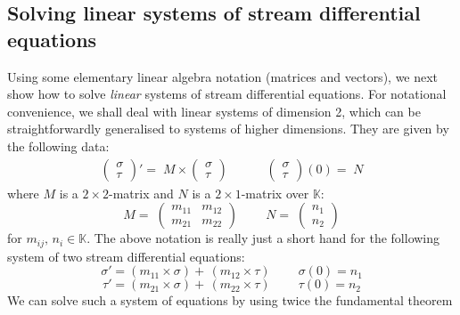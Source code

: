 \documentclass[3p]{elsarticle}
\newcommand{\matrixproduct}{\times} %
\newcommand{\streamproduct}{\times} %
\newcommand{\K}{\mathbb{K}}            %
\begin{document}
\subsection{Solving linear systems of stream differential equations}
\label{Solving linear systems of stream differential equations}
Using some elementary linear algebra notation (matrices and vectors),
we next show how to solve \emph{linear} systems of stream differential equations.
For notational convenience, we shall deal with linear systems of dimension 2,
which can be straightforwardly generalised to systems of higher dimensions.
They are given by the following data:
\begin{eqnarray}\label{linear_system_of_dimension_2}
\begin{pmatrix}%
\sigma \\ \tau
\end{pmatrix} '
= \; M \matrixproduct
\begin{pmatrix}%
\sigma \\ \tau
\end{pmatrix}
\;\;\;\;\;\;\;\;\;\;\;
\begin{pmatrix}%
\sigma \\ \tau
\end{pmatrix} (0)
= \;
N
\end{eqnarray}
where $M$ is a $2 \times 2$-matrix and $N$ is a $2 \times 1$-matrix
over $\K$:
\[
M = \;
\begin{pmatrix}%
m_{11} & m_{12} \\ m_{21} & m_{22}
\end{pmatrix}
\;\;\;\;\;\;\;\;
N = \;
\begin{pmatrix}%
n_1 \\ n_2
\end{pmatrix}
\]
for $m_{ij}, \, n_i \in \K$. The above notation is really just a
short hand for the following system of two stream differential
equations:
\[
\sigma ' = (m_{11} \streamproduct \sigma) + \, (m_{12}
\streamproduct \tau ) \;\;\;\;\;\;\;\; \sigma(0) = n_1
\]
\[
\tau  ' = (m_{21} \streamproduct \sigma) + \, (m_{22} \streamproduct
\tau ) \;\;\;\;\;\;\;\; \tau(0) = n_2
\]
We can solve such a system of equations by using twice the fundamental theorem
\end{document}
